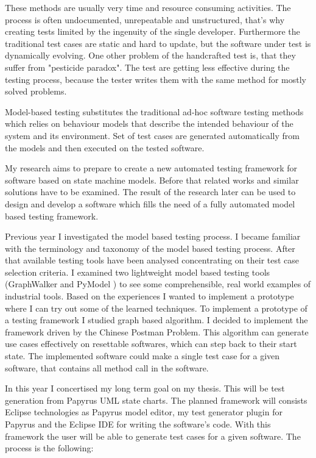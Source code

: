 \documentclass{article}
\begin{document}
These methods are usually very time and resource consuming activities. The process is often undocumented, unrepeatable and unstructured, that's why creating tests limited by the ingenuity of the single developer. Furthermore the traditional test cases are static and hard to update, but the software under test is dynamically evolving. One other problem of the handcrafted test is, that they suffer from "pesticide paradox". The test are getting less effective during the testing process, because the tester writes them with the same method for mostly solved problems.

Model-based testing substitutes the traditional ad-hoc software testing methods which relies on behaviour models that describe the intended behaviour of the system and its environment. Set of test cases are generated automatically from the models and then executed on the tested software.

My research aims to prepare to create a new automated testing framework for software based on state machine models. Before that related works and similar solutions have to be examined. The result of the research later can be used to design and develop a software which fills the need of a fully automated model based testing framework.\newline

Previous year I investigated the model based testing process. I became familiar with the terminology and taxonomy of the model based testing process. After that available testing tools have been analysed concentrating on their test case selection criteria. I examined two lightweight model based testing tools (GraphWalker \cite{graphwalker} and PyModel \cite{pymodel}) to see some comprehensible, real world examples of industrial tools. Based on the experiences I wanted to implement a prototype where I can try out some of the learned techniques. To implement a prototype of a testing framework I studied graph based algorithm. I decided to implement the framework driven by the Chinese Postman Problem. This algorithm can generate use cases effectively on resettable softwares, which can step back to their start state. The implemented software could make a single test case for a given software, that contains all method call in the software.

In this year I concertised my long term goal on my thesis. This will be test generation from Papyrus \cite{papyrus} UML state charts. The planned framework will consists Eclipse technologies as Papyrus model editor, my test generator plugin for Papyrus and the Eclipse IDE for writing the software's code. With this framework the user will be able to generate test cases for a given software. The process is the following:
\end{document}

